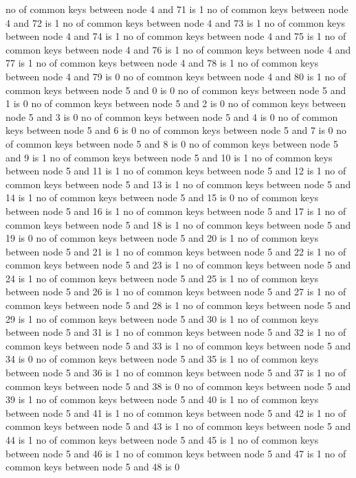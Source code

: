 no of common keys between node 4 and 71 is 1
no of common keys between node 4 and 72 is 1
no of common keys between node 4 and 73 is 1
no of common keys between node 4 and 74 is 1
no of common keys between node 4 and 75 is 1
no of common keys between node 4 and 76 is 1
no of common keys between node 4 and 77 is 1
no of common keys between node 4 and 78 is 1
no of common keys between node 4 and 79 is 0
no of common keys between node 4 and 80 is 1
no of common keys between node 5 and 0 is 0
no of common keys between node 5 and 1 is 0
no of common keys between node 5 and 2 is 0
no of common keys between node 5 and 3 is 0
no of common keys between node 5 and 4 is 0
no of common keys between node 5 and 6 is 0
no of common keys between node 5 and 7 is 0
no of common keys between node 5 and 8 is 0
no of common keys between node 5 and 9 is 1
no of common keys between node 5 and 10 is 1
no of common keys between node 5 and 11 is 1
no of common keys between node 5 and 12 is 1
no of common keys between node 5 and 13 is 1
no of common keys between node 5 and 14 is 1
no of common keys between node 5 and 15 is 0
no of common keys between node 5 and 16 is 1
no of common keys between node 5 and 17 is 1
no of common keys between node 5 and 18 is 1
no of common keys between node 5 and 19 is 0
no of common keys between node 5 and 20 is 1
no of common keys between node 5 and 21 is 1
no of common keys between node 5 and 22 is 1
no of common keys between node 5 and 23 is 1
no of common keys between node 5 and 24 is 1
no of common keys between node 5 and 25 is 1
no of common keys between node 5 and 26 is 1
no of common keys between node 5 and 27 is 1
no of common keys between node 5 and 28 is 1
no of common keys between node 5 and 29 is 1
no of common keys between node 5 and 30 is 1
no of common keys between node 5 and 31 is 1
no of common keys between node 5 and 32 is 1
no of common keys between node 5 and 33 is 1
no of common keys between node 5 and 34 is 0
no of common keys between node 5 and 35 is 1
no of common keys between node 5 and 36 is 1
no of common keys between node 5 and 37 is 1
no of common keys between node 5 and 38 is 0
no of common keys between node 5 and 39 is 1
no of common keys between node 5 and 40 is 1
no of common keys between node 5 and 41 is 1
no of common keys between node 5 and 42 is 1
no of common keys between node 5 and 43 is 1
no of common keys between node 5 and 44 is 1
no of common keys between node 5 and 45 is 1
no of common keys between node 5 and 46 is 1
no of common keys between node 5 and 47 is 1
no of common keys between node 5 and 48 is 0
